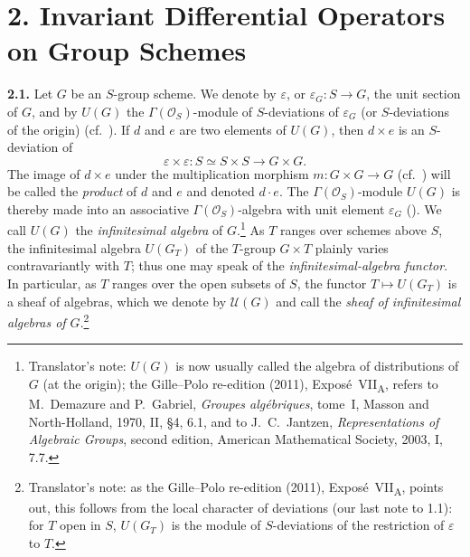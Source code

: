 
\section*{2. Invariant Differential Operators on Group Schemes}
\label{sga3:VIIA:2}

\medskip
\noindent\textbf{2.1.}
\label{sga3:VIIA:2.1}
Let \(G\) be an \(S\)-group scheme. We denote by \(\varepsilon\), or
\(\varepsilon_G:S\to G\), the unit section of \(G\), and by \(U(G)\) the
\(\Gamma(\mathcal O_S)\)-module of \(S\)-deviations of
\(\varepsilon_G\) (or \(S\)-deviations of the origin)
(cf.~). If \(d\) and \(e\) are two elements of \(U(G)\), then
\(d\times e\) is an \(S\)-deviation of
\[
  \varepsilon\times\varepsilon:
  S\simeq S\times S\longrightarrow G\times G.
\]
The image of \(d\times e\) under the multiplication morphism
\(m:G\times G\to G\) (cf.~) will be called the \emph{product} of
\(d\) and \(e\) and denoted \(d\cdot e\). The
\(\Gamma(\mathcal O_S)\)-module \(U(G)\) is thereby made into an
associative \(\Gamma(\mathcal O_S)\)-algebra with unit element
\(\varepsilon_G\) (). We call \(U(G)\) the \emph{infinitesimal
algebra} of \(G\).\footnote{Translator's note: \(U(G)\) is now usually
called the algebra of distributions of \(G\) (at the origin); the
Gille--Polo re-edition (2011), Expos\'e~VII\textsubscript{A}, refers to
M.~Demazure and P.~Gabriel, \textit{Groupes alg\'ebriques}, tome~I,
Masson and North-Holland, 1970, II, \S4, 6.1, and to J.~C.~Jantzen,
\textit{Representations of Algebraic Groups}, second edition, American
Mathematical Society, 2003, I, 7.7.} As \(T\) ranges over schemes above \(S\), the
infinitesimal algebra \(U(G_T)\) of the \(T\)-group \(G\times T\)
plainly varies contravariantly with \(T\); thus one may speak of the
\emph{infinitesimal-algebra functor}. In particular, as \(T\) ranges
over the open subsets of \(S\), the functor \(T\mapsto U(G_T)\) is a
sheaf of algebras, which we denote by \(\mathcal U(G)\) and call the
\emph{sheaf of infinitesimal algebras of \(G\)}.\footnote{Translator's
note: as the Gille--Polo re-edition (2011), Expos\'e~VII\textsubscript{A},
points out, this follows from the local character of deviations (our
last note to 1.1): for \(T\) open in \(S\), \(U(G_T)\) is the module of
\(S\)-deviations of the restriction of \(\varepsilon\) to \(T\).}

